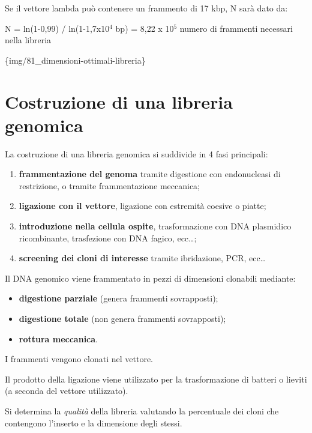 \documentclass[11pt]{book}
\begin{document}
Se il vettore lambda può contenere un frammento di 17 kbp, N sarà dato
da:

N = ln(1-0,99) / ln(1-1,7x10\(^4\) bp) = 8,22 x 10\(^5\) numero di
frammenti necessari nella libreria

\{img/81\_dimensioni-ottimali-libreria\}

\section{Costruzione di una libreria
genomica}\label{costruzione-di-una-libreria-genomica}

La costruzione di una libreria genomica si suddivide in 4 fasi
principali:

\begin{enumerate}
\def\labelenumi{\arabic{enumi}.}
\itemsep1pt\parskip0pt
\item
  \textbf{frammentazione del genoma} tramite digestione con endonucleasi
  di restrizione, o tramite frammentazione meccanica;
\item
  \textbf{ligazione con il vettore}, ligazione con estremità coesive o
  piatte;
\item
  \textbf{introduzione nella cellula ospite}, trasformazione con DNA
  plasmidico ricombinante, trasfezione con DNA fagico, ecc\ldots{};
\item
  \textbf{screening dei cloni di interesse} tramite ibridazione, PCR,
  ecc\ldots{}
\end{enumerate}

Il DNA genomico viene frammentato in pezzi di dimensioni clonabili
mediante:

\begin{itemize}
\itemsep1pt\parskip0pt
\item
  \textbf{digestione parziale} (genera frammenti sovrapposti);
\item
  \textbf{digestione totale} (non genera frammenti sovrapposti);
\item
  \textbf{rottura meccanica}.
\end{itemize}

I frammenti vengono clonati nel vettore.

Il prodotto della ligazione viene utilizzato per la trasformazione di
batteri o lieviti (a seconda del vettore utilizzato).

Si determina la \emph{qualità} della libreria valutando la percentuale
dei cloni che contengono l'inserto e la dimensione degli stessi.
\end{document}
